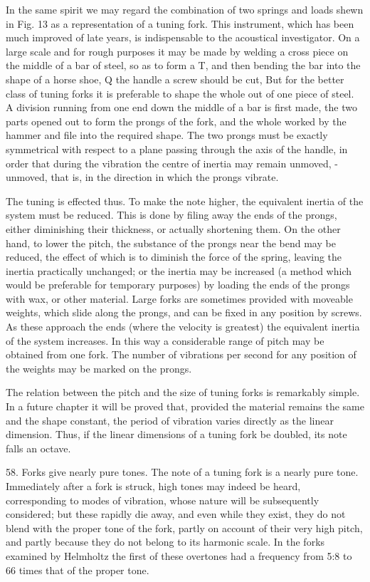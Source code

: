 In the same spirit we may regard the combination of two springs and loads shewn
in Fig. 13 as a representation of a tuning fork. This instrument, which has
been much improved of late years, is indispensable to the acoustical
investigator. On a large scale and for rough purposes it may be made by welding
a cross piece on the middle of a bar of steel, so as to form a T, and then
bending the bar into the shape of a horse shoe, Q the handle a screw should be
cut, But for the better class of tuning forks it is preferable to shape the
whole out of one piece of steel. A division running from one end down the
middle of a bar is first made, the two parts opened out to form the prongs of
the fork, and the whole worked by the hammer and file into the required shape.
The two prongs must be exactly symmetrical with respect to a plane passing
through the axis of the handle, in order that during the vibration the centre
of inertia may remain unmoved, - unmoved, that is, in the direction in which
the prongs vibrate.

The tuning is effected thus. To make the note higher, the equivalent inertia of
the system must be reduced. This is done by filing away the ends of the prongs,
either diminishing their thickness, or actually shortening them. On the other
hand, to lower the pitch, the substance of the prongs near the bend may be
reduced, the effect of which is to diminish the force of the spring, leaving
the inertia practically unchanged; or the inertia may be increased (a method
which would be preferable for temporary purposes) by loading the ends of the
prongs with wax, or other material. Large forks are sometimes provided with
moveable weights, which slide along the prongs, and can be fixed in any
position by screws. As these approach the ends (where the velocity is greatest)
the equivalent inertia of the system increases. In this way a considerable
range of pitch may be obtained from one fork. The number of vibrations per
second for any position of the weights may be marked on the prongs.

The relation between the pitch and the size of tuning forks is remarkably
simple. In a future chapter it will be proved that, provided the material
remains the same and the shape constant, the period of vibration varies
directly as the linear dimension. Thus, if the linear dimensions of a tuning
fork be doubled, its note falls an octave.

58.  Forks give nearly pure tones.
The note of a tuning fork is a nearly pure tone. Immediately
after a fork is struck, high tones may indeed be heard, corresponding to modes
of vibration, whose nature will be subsequently considered; but these rapidly
die away, and even while they exist, they do not blend with the proper tone of
the fork, partly on account of their very high pitch, and partly because they
do not belong to its harmonic scale. In the forks examined by Helmholtz the
first of these overtones had a frequency from 5:8 to 66 times that of the
proper tone.

